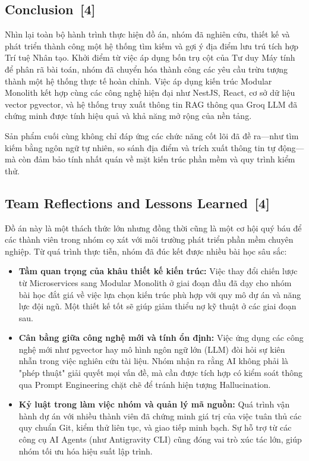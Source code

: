 \documentclass[12pt, a4paper]{article}
\begin{document}
\subsection[Conclusion]{Conclusion \,{\normalfont\small\textcolor{cyan!70!black}{[4]}}}
Nhìn lại toàn bộ hành trình thực hiện đồ án, nhóm đã nghiên cứu, thiết kế và phát triển thành công một hệ thống tìm kiếm và gợi ý địa điểm lưu trú tích hợp Trí tuệ Nhân tạo. Khởi điểm từ việc áp dụng bốn trụ cột của Tư duy Máy tính để phân rã bài toán, nhóm đã chuyển hóa thành công các yêu cầu trừu tượng thành một hệ thống thực tế hoàn chỉnh. Việc áp dụng kiến trúc Modular Monolith kết hợp cùng các công nghệ hiện đại như NestJS, React, cơ sở dữ liệu vector pgvector, và hệ thống truy xuất thông tin RAG thông qua Groq LLM đã chứng minh được tính hiệu quả và khả năng mở rộng của nền tảng. 

Sản phẩm cuối cùng không chỉ đáp ứng các chức năng cốt lõi đã đề ra---như tìm kiếm bằng ngôn ngữ tự nhiên, so sánh địa điểm và trích xuất thông tin tự động---mà còn đảm bảo tính nhất quán về mặt kiến trúc phần mềm và quy trình kiểm thử.

\subsection[Team Reflections and Lessons Learned]{Team Reflections and Lessons Learned \,{\normalfont\small\textcolor{cyan!70!black}{[4]}}}
Đồ án này là một thách thức lớn nhưng đồng thời cũng là một cơ hội quý báu để các thành viên trong nhóm cọ xát với môi trường phát triển phần mềm chuyên nghiệp. Từ quá trình thực tiễn, nhóm đã đúc kết được nhiều bài học sâu sắc:

\begin{itemize}
    \item \textbf{Tầm quan trọng của khâu thiết kế kiến trúc:} Việc thay đổi chiến lược từ Microservices sang Modular Monolith ở giai đoạn đầu đã dạy cho nhóm bài học đắt giá về việc lựa chọn kiến trúc phù hợp với quy mô dự án và năng lực đội ngũ. Một thiết kế tốt sẽ giúp giảm thiểu nợ kỹ thuật ở các giai đoạn sau.
    \item \textbf{Cân bằng giữa công nghệ mới và tính ổn định:} Việc ứng dụng các công nghệ mới như pgvector hay mô hình ngôn ngữ lớn (LLM) đòi hỏi sự kiên nhẫn trong việc nghiên cứu tài liệu. Nhóm nhận ra rằng AI không phải là "phép thuật" giải quyết mọi vấn đề, mà cần được tích hợp có kiểm soát thông qua Prompt Engineering chặt chẽ để tránh hiện tượng Hallucination.
    \item \textbf{Kỷ luật trong làm việc nhóm và quản lý mã nguồn:} Quá trình vận hành dự án với nhiều thành viên đã chứng minh giá trị của việc tuân thủ các quy chuẩn Git, kiểm thử liên tục, và giao tiếp minh bạch. Sự hỗ trợ từ các công cụ AI Agents (như Antigravity CLI) cũng đóng vai trò xúc tác lớn, giúp nhóm tối ưu hóa hiệu suất lập trình.
\end{itemize}
\end{document}
